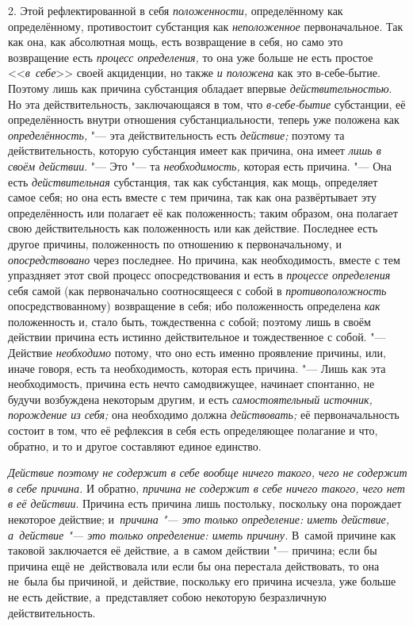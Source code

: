 2. Этой рефлектированной в себя {\em положенности,}
определённому как определённому, противостоит субстанция как
{\em неположенное} первоначальное. Так как она, как
абсолютная мощь, есть возвращение в себя, но само это возвращение есть
{\em процесс определения,} то она уже больше не есть
простое <<{\em в~себе}>> своей акциденции, но также
{\em и положена} как это в-себе-бытие. Поэтому лишь как
причина субстанция обладает впервые
{\em действительностью}. Но эта действительность,
заключающаяся в том, что {\em в-себе-бытие} субстанции,
её определённость внутри отношения субстанциальности, теперь уже положена
как {\em определённость,} "--- эта действительность есть
{\em действие;} поэтому та действительность, которую
субстанция имеет как причина, она имеет {\em лишь в
своём действии}. "--- Это "--- та {\em необходимость,}
которая есть причина. "--- Она есть {\em действительная}
субстанция, так как субстанция, как мощь, определяет самое себя; но она
есть вместе с тем причина, так как она развёртывает эту определённость или
полагает её как положенность; таким образом, она полагает свою
действительность как положенность или как действие. Последнее есть другое
причины, положенность по отношению к первоначальному, и
{\em опосредствовано} через последнее. Но причина, как
необходимость, вместе с тем упраздняет этот свой процесс опосредствования и
есть в {\em процессе определения} себя самой (как
первоначально соотносящееся с собой в
{\em противоположность} опосредствованному) возвращение
в себя; ибо положенность определена {\em как}
положенность и, стало быть, тождественна с собой; поэтому лишь в своём
действии причина есть истинно действительное и тождественное с собой. "---
Действие {\em необходимо} потому, что оно есть именно
проявление причины, или, иначе говоря, есть та необходимость, которая есть
причина. "--- Лишь как эта необходимость, причина есть нечто самодвижущее,
начинает спонтанно, не будучи возбуждена некоторым другим, и есть
{\em самостоятельный источник, порождение из себя;} она
необходимо должна {\em действовать;} её
первоначальность состоит в том, что её рефлексия в себя есть определяющее
полагание и что, обратно, и то и другое составляют единое единство.

{\em Действие поэтому не содержит в себе вообще ничего такого, чего не содержит
в себе причина.} И обратно, {\em причина не содержит в себе ничего такого, чего
нет в её действии}. Причина есть причина лишь постольку, поскольку она
порождает некоторое действие; и~{\em причина "--- это только определение:
иметь действие, а~действие "--- это только определение: иметь причину.}
В~самой причине как таковой заключается её действие, а~в самом действии "---
причина; если бы причина ещё не~действовала или если бы она перестала
действовать, то она не~была бы причиной, и~действие, поскольку его причина
исчезла, уже больше не есть действие, а~представляет собою некоторую
безразличную действительность.


